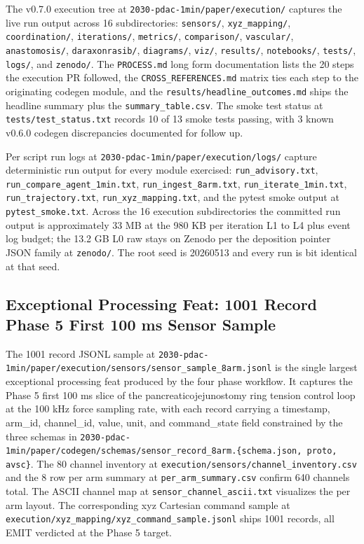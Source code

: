 The v0.7.0 execution tree at
\texttt{2030-pdac-1min/paper/execution/} captures the live run
output across 16 subdirectories: \texttt{sensors/},
\texttt{xyz_mapping/}, \texttt{coordination/}, \texttt{iterations/},
\texttt{metrics/}, \texttt{comparison/}, \texttt{vascular/},
\texttt{anastomosis/}, \texttt{daraxonrasib/}, \texttt{diagrams/},
\texttt{viz/}, \texttt{results/}, \texttt{notebooks/},
\texttt{tests/}, \texttt{logs/}, and \texttt{zenodo/}. The
\texttt{PROCESS.md} long form documentation lists the 20 steps the
execution PR followed, the \texttt{CROSS_REFERENCES.md} matrix
ties each step to the originating codegen module, and the
\texttt{results/headline_outcomes.md} ships the headline summary
plus the \texttt{summary_table.csv}. The smoke test status at
\texttt{tests/test_status.txt} records 10 of 13 smoke tests
passing, with 3 known v0.6.0 codegen discrepancies documented for
follow up.

Per script run logs at \texttt{2030-pdac-1min/paper/execution/logs/}
capture deterministic run output for every module exercised:
\texttt{run_advisory.txt}, \texttt{run_compare_agent_1min.txt},
\texttt{run_ingest_8arm.txt}, \texttt{run_iterate_1min.txt},
\texttt{run_trajectory.txt}, \texttt{run_xyz_mapping.txt}, and the
pytest smoke output at \texttt{pytest_smoke.txt}. Across the 16
execution subdirectories the committed run output is approximately
33 MB at the 980 KB per iteration L1 to L4 plus event log budget;
the 13.2 GB L0 raw stays on Zenodo per the deposition pointer
JSON family at \texttt{zenodo/}. The root seed is 20260513 and
every run is bit identical at that seed.

\subsection{Exceptional Processing Feat: 1001 Record Phase 5 First 100 ms Sensor Sample}
\label{sec:results-feat}

The 1001 record JSONL sample at
\texttt{2030-pdac-1min/paper/execution/sensors/sensor_sample_8arm.jsonl}
is the single largest exceptional processing feat produced by the
four phase workflow. It captures the Phase 5 first 100 ms slice
of the pancreaticojejunostomy ring tension control loop at the
100 kHz force sampling rate, with each record carrying a
timestamp, arm_id, channel_id, value, unit, and command_state
field constrained by the three schemas in
\texttt{2030-pdac-1min/paper/codegen/schemas/sensor_record_8arm.\{schema.json, proto, avsc\}}.
The 80 channel inventory at
\texttt{execution/sensors/channel_inventory.csv} and the 8 row
per arm summary at \texttt{per_arm_summary.csv} confirm 640
channels total. The ASCII channel map at
\texttt{sensor_channel_ascii.txt} visualizes the per arm layout.
The corresponding xyz Cartesian command sample at
\texttt{execution/xyz_mapping/xyz_command_sample.jsonl} ships 1001
records, all EMIT verdicted at the Phase 5 target.

